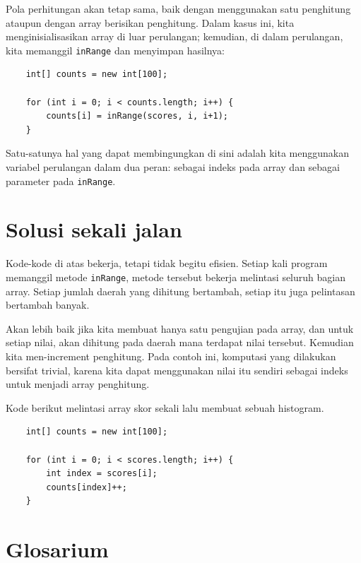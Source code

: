 Pola perhitungan akan tetap sama, baik dengan menggunakan satu penghitung ataupun dengan array berisikan penghitung. Dalam kasus ini, kita menginisialisasikan array di luar perulangan; kemudian, di dalam perulangan, kita memanggil {\tt inRange} dan menyimpan hasilnya:

\begin{lstlisting}
    int[] counts = new int[100];

    for (int i = 0; i < counts.length; i++) {
        counts[i] = inRange(scores, i, i+1);
    }
\end{lstlisting}
%
Satu-satunya hal yang dapat membingungkan di sini adalah kita menggunakan variabel perulangan dalam dua peran: sebagai indeks pada array dan sebagai parameter pada
{\tt inRange}.


\section{Solusi sekali jalan}
\label{singlepass}

Kode-kode di atas bekerja, tetapi tidak begitu efisien. Setiap kali program memanggil metode {\tt inRange}, metode tersebut bekerja melintasi seluruh bagian array.  Setiap jumlah daerah yang dihitung bertambah, setiap itu juga pelintasan bertambah banyak.

Akan lebih baik jika kita membuat hanya satu pengujian pada array, dan untuk setiap nilai, akan dihitung pada daerah mana terdapat nilai tersebut. Kemudian kita men-increment penghitung. Pada contoh ini, komputasi yang dilakukan bersifat trivial, karena kita dapat menggunakan nilai itu sendiri sebagai indeks untuk menjadi array penghitung.

Kode berikut melintasi array skor sekali lalu membuat sebuah histogram.

\begin{lstlisting}
    int[] counts = new int[100];

    for (int i = 0; i < scores.length; i++) {
        int index = scores[i];
        counts[index]++;
    }
\end{lstlisting}


\section{Glosarium}

